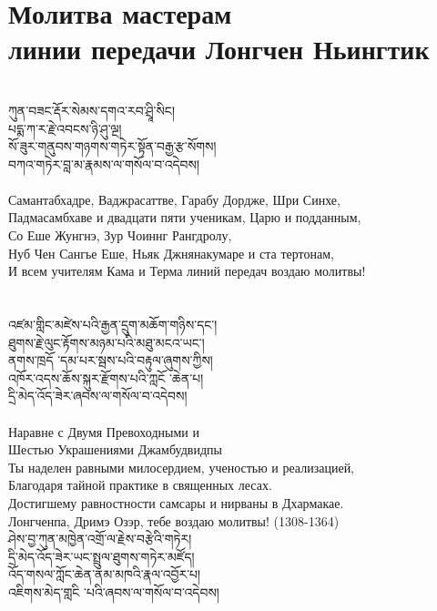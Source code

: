 \section{Молитва мастерам \\линии передачи Лонгчен Ньингтик}
\\
\ti
ཀུན་བཟང་རྡོར་སེམས་དགའ་རབ་ཤྲཱི་སིང།\\
པདྨ་ཀ་ར་རྗེ་འབངས་ཉི་ཤུ་ལྔ།\\
སོ་ཟུར་གནུབས་གཉགས་གཏེར་སྟོན་བརྒྱ་རྩ་སོགས།\\
བཀའ་གཏེར་བླ་མ་རྣམས་ལ་གསོལ་བ་འདེབས།\\
\\
\ru
Самантабхадре, Ваджрасаттве, Гарабу Дордже, Шри Синхе,\\
Падмасамбхаве и двадцати пяти ученикам, Царю и подданным,\\
Со Еше Жунгнэ, Зур Чоиннг Рангдролу,\\
Нуб Чен Сангье Еше, Ньяк Джнянакумаре и ста тертонам,\\
И всем учителям Кама и Терма линий передач воздаю молитвы!\\
\\
\\
\ti
འཛམ་གླིང་མཛེས་པའི་རྒྱན་དྲུག་མཆོག་གཉིས་དང་། \\
ཐུགས་རྗེ་ལུང་རྟོགས་མཉམ་པའི་མཐུ་མངའ་ཡང་། \\
ནགས་ཁྲདོ ་དམ་པར་སྦས་པའི་བརྟུལ་ཞུགས་ཀྱིས། \\
འཁོར་འདས་ཆོས་སྐུར་རྫོགས་པའི་ཀླངོ ་ཆེན་པ། \\
དྲི་མེད་འོད་ཟེར་ཞབས་ལ་གསོལ་བ་འདེབས།\\
\\
\ru
Наравне с Двумя Превоходными и \\
Шестью Украшениями Джамбудвидпы\\
Ты наделен равными милосердием, ученостью и реализацией,\\
Благодаря тайной практике в священных лесах.\\
Достигшему равностности самсары и нирваны в Дхармакае.\\
Лонгченпа, Дримэ Озэр, тебе воздаю молитвы! (1308-1364)
\\
\newpage
\ti
ཤེས་བྱ་ཀུན་མཁྱེན་འགྲོ་ལ་རྗེས་བརྩེའི་གཏེར། \\
དྲི་མེད་འོད་ཟེར་ཡང་སྤྲུལ་ཐུགས་གཏེར་མཛོད། \\
འོད་གསལ་ཀློང་ཆེན་ནམ་མཁའི་རྣལ་འབྱོར་པ། \\
འཇིགས་མེད་གླངི ་པའི་ཞབས་ལ་གསོལ་བ་འདེབས།\\
\\
